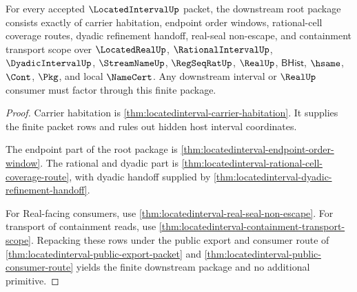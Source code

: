 \begin{theorem}
\label{thm:locatedinterval-downstream-root-package}
For every accepted $\LocatedIntervalUp$ packet, the downstream root package consists exactly of carrier habitation, endpoint order windows, rational-cell coverage routes, dyadic refinement handoff, real-seal non-escape, and containment transport scope over $\LocatedRealUp$, $\RationalIntervalUp$, $\DyadicIntervalUp$, $\StreamNameUp$, $\RegSeqRatUp$, $\RealUp$, $\mathsf{BHist}$, $\hsame$, $\Cont$, $\Pkg$, and local $\NameCert$. Any downstream interval or $\RealUp$ consumer must factor through this finite package.
\end{theorem}
\begin{proof}
Carrier habitation is \autoref{thm:locatedinterval-carrier-habitation}. It supplies the finite packet rows and rules out hidden host interval coordinates.

The endpoint part of the root package is \autoref{thm:locatedinterval-endpoint-order-window}. The rational and dyadic part is \autoref{thm:locatedinterval-rational-cell-coverage-route}, with dyadic handoff supplied by \autoref{thm:locatedinterval-dyadic-refinement-handoff}.

For Real-facing consumers, use \autoref{thm:locatedinterval-real-seal-non-escape}. For transport of containment reads, use \autoref{thm:locatedinterval-containment-transport-scope}. Repacking these rows under the public export and consumer route of \autoref{thm:locatedinterval-public-export-packet} and \autoref{thm:locatedinterval-public-consumer-route} yields the finite downstream package and no additional primitive.
\end{proof}

